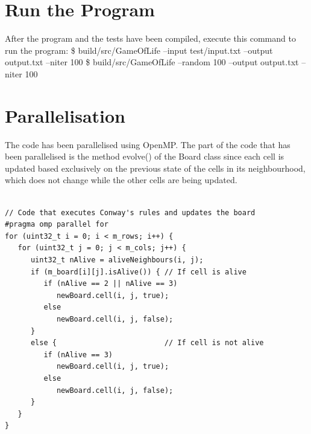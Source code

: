\documentclass[a4paper,12pt,twoside]{report}
\begin{document}
\section*{Run the Program}
After the program and the tests have been compiled, execute this command to run the program:
\newline
\$ build/src/GameOfLife --input test/input.txt --output output.txt --niter 100\newline
\$ build/src/GameOfLife --random 100 --output output.txt --niter 100
\section*{Parallelisation}
The code has been parallelised using OpenMP. The part of the code that has been parallelised is the method evolve() of the Board class since each cell is updated  based exclusively on the previous state of the cells in its neighbourhood, which does not change while the other cells are being updated.
\begin{lstlisting}

// Code that executes Conway's rules and updates the board
#pragma omp parallel for
for (uint32_t i = 0; i < m_rows; i++) {
   for (uint32_t j = 0; j < m_cols; j++) {
      uint32_t nAlive = aliveNeighbours(i, j);
      if (m_board[i][j].isAlive()) { // If cell is alive
         if (nAlive == 2 || nAlive == 3)
            newBoard.cell(i, j, true);
         else
            newBoard.cell(i, j, false);
	  }
	  else {                         // If cell is not alive
         if (nAlive == 3)
            newBoard.cell(i, j, true);
         else
            newBoard.cell(i, j, false);
      }
   }
}
\end{lstlisting}
\end{document}
